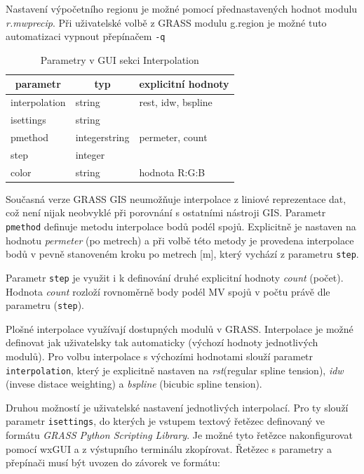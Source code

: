 \documentclass[a4paper,12pt,oneside]{report}
\begin{document}
Nastavení  výpočetního regionu je možné pomocí přednastavených hodnot modulu \textit{r.mwprecip}. Při uživatelské volbě z GRASS modulu g.region je možné tuto automatizaci vypnout přepínačem \texttt{-q}
\begin{table}[h]
\centering
\begin{tabular}{|lll|}
\hline
\multicolumn{1}{|c}{parametr} & \multicolumn{1}{c}{typ} & \multicolumn{1}{c|}{explicitní hodnoty} \\ \hline\hline
interpolation                          & string                  & rest, idw, bspline           \\
isettings                              & string                  &                              \\
pmethod                                & integerstring           & permeter, count              \\
step                                   & integer                 &                              \\
color                                  & string                  & hodnota R:G:B                \\ \hline
\end{tabular}
\caption{Parametry v GUI sekci Interpolation}
\end{table}
Současná verze GRASS GIS neumožňuje interpolace z liniové reprezentace dat, což není nijak neobvyklé při porovnání s ostatními nástroji GIS. Parametr \texttt{pmethod} definuje metodu interpolace bodů podél spojů. Explicitně je nastaven na hodnotu \emph{permeter} (po metrech) a při volbě této metody je provedena interpolace bodů v pevně stanoveném kroku po metrech [m], který vychází z parametru \texttt{step}.

Parametr \texttt{step} je využit i k definování  druhé explicitní hodnoty \emph{count} (počet). Hodnota \emph{count} rozloží rovnoměrně body podél MV spojů v počtu právě dle parametru (\texttt{step}).

Plošné interpolace využívají dostupných modulů v GRASS. Interpolace je možné definovat jak uživatelsky tak automaticky (výchozí hodnoty jednotlivých modulů). Pro volbu interpolace s výchozími hodnotami slouží parametr \texttt{interpolation}, který je explicitně nastaven na \emph{rst}(regular spline tension), \emph{idw} (invese distace weighting) a \emph{bspline} (bicubic spline tension). 

Druhou možností je uživatelské nastavení jednotlivých interpolací. Pro ty slouží parametr \texttt{isettings}, do kterých je vstupem textový řetězec definovaný ve formátu \textit{GRASS Python Scripting Library}. Je možné tyto řetězce nakonfigurovat pomocí wxGUI a z výstupního terminálu zkopírovat. Řetězec s parametry a přepínači musí být uvozen do závorek ve formátu:     
\end{document}
